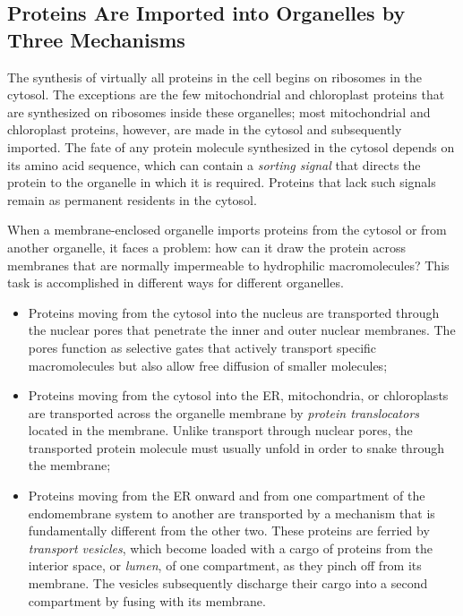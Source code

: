 \subsection{Proteins Are Imported into Organelles by Three Mechanisms}

The synthesis of virtually all proteins in the cell begins on ribosomes in
the cytosol. The exceptions are the few mitochondrial and chloroplast
proteins that are synthesized on ribosomes inside these organelles; most
mitochondrial and chloroplast proteins, however, are made in the cytosol
and subsequently imported. The fate of any protein molecule synthesized
in the cytosol depends on its amino acid sequence, which can contain
a \textit{sorting signal} that directs the protein to the organelle in which it is
required. Proteins that lack such signals remain as permanent residents
in the cytosol.

When a membrane-enclosed organelle imports proteins from the cytosol
or from another organelle, it faces a problem: how can it draw the
protein across membranes that are normally impermeable to hydrophilic
macromolecules? This task is accomplished in different ways for different
organelles.

\begin{itemize}
\item Proteins moving from the cytosol into the nucleus are transported
through the nuclear pores that penetrate the inner and outer
nuclear membranes. The pores function as selective gates that
actively transport specific macromolecules but also allow free diffusion 
of smaller molecules;
\item Proteins moving from the cytosol into the ER, mitochondria, or
chloroplasts are transported across the organelle membrane by
\textit{protein translocators} located in the membrane. Unlike transport
through nuclear pores, the transported protein molecule must usually 
unfold in order to snake through the membrane;
\item Proteins moving from the ER onward and from one compartment of
the endomembrane system to another are transported by a mechanism 
that is fundamentally different from the other two. These
proteins are ferried by \textit{transport vesicles}, which become loaded
with a cargo of proteins from the interior space, or \textit{lumen}, of one
compartment, as they pinch off from its membrane. The vesicles
subsequently discharge their cargo into a second compartment by
fusing with its membrane.
\end{itemize}

